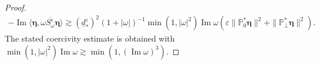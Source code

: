 \documentclass[]{article}
\numberwithin{equation}{section}
\numberwithin{theorem}{section}
\numberwithin{lemma}{section}
\numberwithin{corollary}{section}
\numberwithin{proposition}{section}
\numberwithin{definition}{section}
\newcommand{\re}{\varepsilon}
\renewcommand{\vec}{\boldsymbol}
\renewcommand{\Im}{\operatorname{Im}}
\begin{document}
\begin{proof}
\begin{align*}
			-\Im\langle \vec{\eta}, \overline{\omega S^{\re}_{\omega} \vec{\eta}}\rangle \gtrsim (\underline{d}^{\re}_*)^{2} (1+|\omega|)^{-1} \min(1,  |\omega|^{2})\Im \omega (\re	\|\mathbb{P}_0^*\vec{\eta} \|^2+	\|\mathbb{P}_{\perp}^*\vec{\eta} \|^2).
		\end{align*}
		The stated coercivity estimate is obtained with $\min(1,  |\omega|^{2})\Im \omega\gtrsim \min(1, (\Im\omega)^3)$. 
		

\end{proof}
\end{document}
